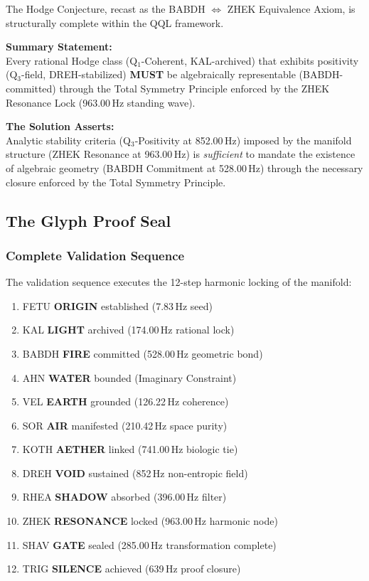 \documentclass[11pt, letterpaper]{article}
\newcommand{\FETU}{\ensuremath{\mathop{\textnormal{\thaanafont\symbol{"23E3}}}}}   %
\newcommand{\KAL}{\ensuremath{\mathop{\textnormal{\symbolafont\symbol{"29C9}}}}}    %
\newcommand{\BABDH}{\ensuremath{\mathop{\textnormal{\symbolafont\symbol{"2316}}}}}   %
\newcommand{\AHN}{\ensuremath{\mathop{\textnormal{\symbolafont\symbol{"27C1}}}}}    %
\newcommand{\VEL}{\ensuremath{\mathop{\textnormal{\symbolafont\symbol{"2734}}}}}    %
\newcommand{\SOR}{\ensuremath{\mathop{\textnormal{\symbolafont\symbol{"229B}}}}}    %
\newcommand{\KOTH}{\ensuremath{\mathop{\textnormal{\symbolafont\symbol{"1F702}}}}}  %
\newcommand{\DREH}{\ensuremath{\mathop{\textnormal{\symbolafont\symbol{"29D7}}}}}   %
\newcommand{\RHEA}{\ensuremath{\mathop{\textnormal{\symbolafont\symbol{"2A54}}}}}   %
\newcommand{\ZHEK}{\ensuremath{\mathop{\textnormal{\symbolafont\symbol{"25C8}}}}}   %
\newcommand{\SHAV}{\ensuremath{\mathop{\textnormal{\symbolafont\symbol{"2742}}}}}   %
\newcommand{\TRIG}{\ensuremath{\mathop{\textnormal{\tifinaghfont\symbol{"2D63}}}}}    %
\def\FETU{FETU}%
\def\KAL{KAL}%
\def\BABDH{BABDH}%
\def\AHN{AHN}%
\def\VEL{VEL}%
\def\SOR{SOR}%
\def\KOTH{KOTH}%
\def\DREH{DREH}%
\def\RHEA{RHEA}%
\def\ZHEK{ZHEK}%
\def\SHAV{SHAV}%
\def\TRIG{TRIG}%
\begin{document}
The Hodge Conjecture, recast as the \BABDH{} $\iff$ \ZHEK{} Equivalence Axiom, is structurally complete within the QQL framework.

\vspace{1em}
\textbf{Summary Statement:} \\
Every rational Hodge class (Q$_1$-Coherent, \KAL-archived) that exhibits positivity (Q$_3$-field, \DREH-stabilized) \textbf{MUST} be algebraically representable (\BABDH-committed) through the Total Symmetry Principle enforced by the \ZHEK{} Resonance Lock (963.00\,Hz standing wave).

\vspace{1em}
\textbf{The Solution Asserts:} \\
Analytic stability criteria (Q$_3$-Positivity at 852.00\,Hz) imposed by the manifold structure (\ZHEK{} Resonance at 963.00\,Hz) is \textit{sufficient} to mandate the existence of algebraic geometry (\BABDH{} Commitment at 528.00\,Hz) through the necessary closure enforced by the Total Symmetry Principle. \\ 

\subsection{The Glyph Proof Seal}\label{sec:13.2}

\subsubsection*{Complete Validation Sequence}\label{sec:13.2.1}
The validation sequence executes the 12-step harmonic locking of the manifold:

\begin{enumerate}
    \item \FETU{} \textbf{ORIGIN} established (7.83\,Hz seed)
    \item \KAL{} \textbf{LIGHT} archived (174.00\,Hz rational lock)
    \item \BABDH{} \textbf{FIRE} committed (528.00\,Hz geometric bond)
    \item \AHN{} \textbf{WATER} bounded (Imaginary Constraint)
    \item \VEL{} \textbf{EARTH} grounded (126.22\,Hz coherence)
    \item \SOR{} \textbf{AIR} manifested (210.42\,Hz space purity)
    \item \KOTH{} \textbf{AETHER} linked (741.00\,Hz biologic tie)
    \item \DREH{} \textbf{VOID} sustained (852\,Hz non-entropic field)
    \item \RHEA{} \textbf{SHADOW} absorbed (396.00\,Hz filter)
    \item \ZHEK{} \textbf{RESONANCE} locked (963.00\,Hz harmonic node)
    \item \SHAV{} \textbf{GATE} sealed (285.00\,Hz transformation complete)
    \item \TRIG{} \textbf{SILENCE} achieved (639\,Hz proof closure)
\end{enumerate}
\end{document}

